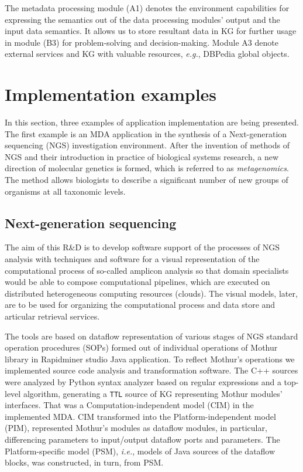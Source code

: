 \documentclass[
]{ceurart}
\begin{document}
The metadata processing module (A1) denotes the environment capabilities for expressing the semantics out of the data processing modules' output and the input data semantics. It allows us to store resultant data in KG for further usage in module (B3) for problem-solving and decision-making. Module A3 denote external services and KG with valuable resources, \emph{e.g.}, DBPedia global objects.

\section{Implementation examples}

In this section, three examples of application implementation are being presented.  The first example is an MDA application in the synthesis of a Next-generation sequencing (NGS) investigation environment.  After the invention of methods of NGS and their introduction in practice of biological systems research, a new direction of molecular genetics is formed, which is referred to as \emph{metagenomics}.  The method allows biologists to describe a significant number of new groups of organisms at all taxonomic levels.

\subsection{Next-generation sequencing}
\label{sec:ngs-impl}

The aim of this R\&D \cite{zont19, aicts2020} is to develop software support of the processes of NGS analysis with techniques and software for a visual representation of the computational process of so-called amplicon analysis so that domain specialists would be able to compose computational pipelines, which are executed on distributed heterogeneous computing resources (clouds).  The visual models, later, are to be used for organizing the computational process and data store and articular retrieval services.

The tools are based on dataflow representation of various stages of NGS standard operation procedures (SOPs)  formed out of individual operations of Mothur library in Rapidminer studio Java application.  To reflect Mothur's operations we implemented source code analysis and transformation software.  The C++ sources were analyzed by Python syntax analyzer based on regular expressions and a top-level algorithm, generating a \verb|TTL| source of KG representing Mothur modules' interfaces.  That was a Computation-independent model (CIM) in the implemented MDA.  CIM transformed into the Platform-independent model (PIM), represented Mothur's modules as dataflow modules, in particular, differencing parameters to input/output dataflow ports and parameters.  The Platform-specific model (PSM), \emph{i.e.}, models of Java sources of the dataflow blocks, was constructed, in turn, from PSM.
\end{document}
